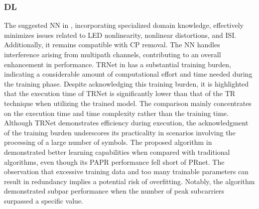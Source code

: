\documentclass[conference]{IEEEtran}
\begin{document}
\subsubsection{DL \cite{b147, b148, b149, b150, b151, b152, b153, b154}}
The suggested NN in \cite{b147}, incorporating specialized domain knowledge, effectively minimizes issues related to LED nonlinearity, nonlinear distortions, and ISI. Additionally, it remains compatible with CP removal. The NN handles interference arising from multipath channels, contributing to an overall enhancement in performance. TRNet in \cite{b148} has a substantial training burden, indicating a considerable amount of computational effort and time needed during the training phase. Despite acknowledging this training burden, it is highlighted that the execution time of TRNet is significantly lower than that of the TR technique when utilizing the trained model. The comparison mainly concentrates on the execution time and time complexity rather than the training time. Although TRNet demonstrates efficiency during execution, the acknowledgment of the training burden underscores its practicality in scenarios involving the processing of a large number of symbols. The proposed algorithm in \cite{b149} demonstrated better learning capabilities when compared with traditional algorithms, even though its PAPR performance fell short of PRnet. The observation that excessive training data and too many trainable parameters can result in redundancy implies a potential risk of overfitting. Notably, the algorithm demonstrated subpar performance when the number of peak subcarriers surpassed a specific value.
\end{document}
